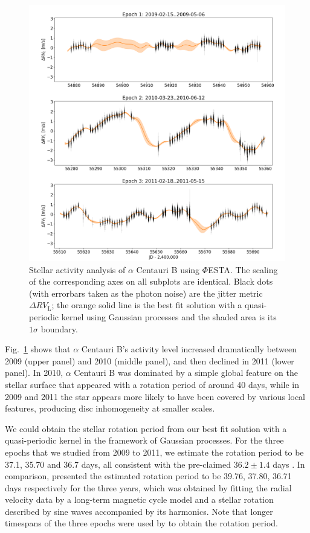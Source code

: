 \begin{figure}[tbp]
\centering
\includegraphics[width = 1.0 \linewidth]
{./Figures/Methods/Alpha_Cen_B.png}
\caption[$\alpha$ Centauri B: stellar activity analysis]
		{Stellar activity analysis of $\alpha$ Centauri B using $\mathit{\Phi}$ESTA. The scaling of the corresponding axes on all subplots are identical. Black dots (with errorbars taken as the photon noise) are the jitter metric $\Delta RV_\text{L}$; the orange solid line is the best fit solution with a quasi-periodic kernel using Gaussian processes and the shaded area is its $1\sigma$ boundary.}
\label{fig:Alpha_Cen_B}
\end{figure} 

Fig.~\ref{fig:Alpha_Cen_B} shows that $\alpha$ Centauri B's activity level increased dramatically between 2009 (upper panel) and 2010 (middle panel), and then declined in 2011 (lower panel). In 2010, $\alpha$ Centauri B was dominated by a simple global feature on the stellar surface that appeared with a rotation period of around 40 days, while in 2009 and 2011 the star appears more likely to have been covered by various local features, producing disc inhomogeneity at smaller scales. 

We could obtain the stellar rotation period from our best fit solution with a quasi-periodic kernel in the framework of Gaussian processes. For the three epochs that we studied from 2009 to 2011, we estimate the rotation period to be 37.1, 35.70 and 36.7 days, all consistent with the pre-claimed $36.2\pm1.4$ days \cite{DeWarf2010}. In comparison, \cite{Dumusque_Centauri_B} presented the estimated rotation period to be 39.76, 37.80, 36.71 days respectively for the three years, which was obtained by fitting the radial velocity data by a long-term magnetic cycle model and a stellar rotation described by sine waves accompanied by its harmonics. Note that longer timespans of the three epochs were used by \cite{Dumusque_Centauri_B} to obtain the rotation period. 

